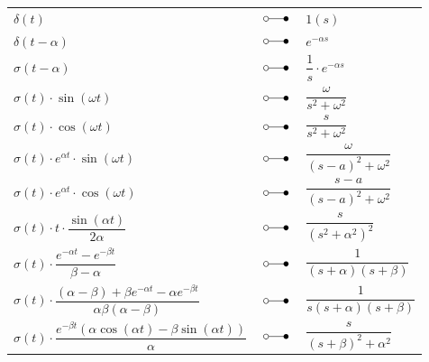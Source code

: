 	\vline
\begin{minipage}{9cm}
\begin{center}
	\begin{tabular}{p{5cm}p{0.75cm}p{3cm}}
	
		$\delta \left( t \right)$ & $\; \laplace \;$ & $1\left( s \right)$ \\
		
		$\delta \left( t - \alpha \right)$ & $\; \laplace \;$ & $e^{- \alpha s}$\\
		
		$\sigma\left( t - \alpha \right)$ & $\; \laplace \;$ & $ \dfrac{1}{s} \cdot e^{- \alpha s}$\\
		
		$\sigma \left( t \right) \cdot \sin \left(\omega t \right)$ & $\; \laplace \;$ &
		$\dfrac{\omega}{s^2 + {\omega^2}}$\\
		
		$\sigma \left( t \right) \cdot \cos \left( \omega t \right)$ & $\; \laplace \;$ &
		$\dfrac{s}{ s^2 + \omega^2}$\\
		
		$\sigma \left( t \right) \cdot  e^{ \alpha t} \cdot \sin \left(\omega t \right)$ & $\; \laplace \;$ 
		& 	$\dfrac{\omega}{(s-a)^2 + {\omega^2}}$\\
		$\sigma \left( t \right) \cdot e^{ \alpha t} \cdot \cos \left( \omega t \right) $ & $\; \laplace \;$ &
		$\dfrac{s-a}{(s-a)^2 + \omega^2}$\\
		
		$\sigma \left( t \right)\cdot t \cdot \dfrac{\sin \left( \alpha t \right)} { 2 \alpha }$ & $\; \laplace \;$ & $\dfrac{s}{ \left(s^ {2}+ \alpha ^{2} \right)^{2}}$ \\
		
		$\sigma \left( t \right)\cdot \dfrac { e ^ { - \alpha t } - e ^ { - \beta t } } { \beta - \alpha }$ & $\; \laplace \;$ & $\dfrac { 1 } { ( s + \alpha ) ( s + \beta ) }$\\
		
		$\sigma \left( t \right)\cdot \dfrac {(\alpha - \beta) +\beta e ^ { - \alpha t } - \alpha e ^ { - \beta t } } { \alpha \beta (\alpha - \beta) }$ & $\; \laplace \;$ & $\dfrac { 1 } {s ( s + \alpha ) ( s + \beta ) }$\\
		
		$\sigma \left( t \right)\cdot \dfrac { e ^ { - \beta t } ( \alpha \cos ( \alpha t ) - \beta \sin ( \alpha t ) ) } { \alpha }$& $\; \laplace \;$ & $\dfrac { s } { ( s + \beta ) ^ { 2 } + \alpha ^ { 2 } }$\\	
	\end{tabular}
\end{center}
\end{minipage}


